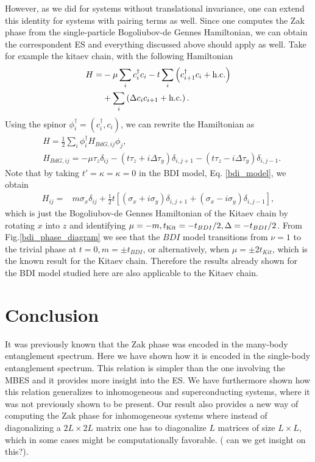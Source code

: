 \documentclass[twocolumn,amsmath,longbibliography,amssymb,superscriptaddress]{revtex4-1}
\newcommand{\carlos}[1]{{\color{red} #1}}
\begin{document}
However, as we did for systems without translational invariance, one can extend this identity for systems with pairing terms as well. Since one computes the Zak phase from the single-particle Bogoliubov-de Gennes Hamiltonian, we can obtain the correspondent ES and everything discussed above should apply as well. Take for example the kitaev chain, with the following Hamiltonian
\begin{align*}
H =& -\mu \sum_{i} c_i^\dagger c_i - t \sum_{i}\left( c_{i+1}^\dagger c_i + {\rm h.c.}\right) \\
&+  \sum_{i}\left( \Delta c_{i} c_{i+1} + {\rm h.c.}\right).
\end{align*}
Using the spinor $\phi_i^\dagger = (c_i^\dagger, c_i)$, we can rewrite the Hamiltonian as
\begin{align*}
&H = \frac{1}{2}\sum_i \phi^\dagger_i H_{BdG,ij} \phi_j,\\
&H_{BdG,ij} = -\mu \tau_z \delta_{ij} - (t \tau_z + i\Delta \tau_y )\delta_{i,j+1}- (t \tau_z - i\Delta \tau_y)\delta_{i,j-1}.
\end{align*}
Note that by taking $t' = \kappa = \kappa = 0$ in the BDI model, Eq. \ref{bdi_model}, we obtain
\begin{align*}
H_{ij} =& m \sigma_x\delta_{ij} + \frac{1}{2} t \left[(\sigma_x + i \sigma_y)\delta_{i,j+1} + (\sigma_x - i \sigma_y) \delta_{i,j-1} \right],
\end{align*}
which is just the Bogoliubov-de Gennes Hamiltonian of the Kitaev chain by rotating $x$ into $z$ and identifying $\mu = -m, t_{\rm Kit} = -t_{BDI}/2, \Delta = -t_{BDI}/2 $. From Fig.\ref{bdi_phase_diagram} we see that the $BDI$ model transitions from $\nu = 1$ to the trivial phase at $t=0, m=\pm t_{BDI}$, or alternatively, when $\mu = \pm 2 t_{Kit}$, which is the known result for the Kitaev chain. Therefore the results already shown for the BDI model studied here are also applicable to the Kitaev chain.  

\section{Conclusion}

It was previously known that the Zak phase was encoded in the many-body entanglement spectrum. Here we have shown how it is encoded in the single-body entanglement spectrum. This relation is simpler than the one involving the MBES and it provides more insight into the ES. We have furthermore shown how this relation generalizes to inhomogeneous and superconducting systems, where it was not previously shown to be present. Our result also provides a new way of computing the Zak phase for inhomogeneous systems where instead of diagonalizing a $2L\times 2L$ matrix one has to diagonalize $L$ matrices of size $L\times L$, which in some cases might be computationally favorable. (\carlos{can we get insight on this?}). 
\end{document}
